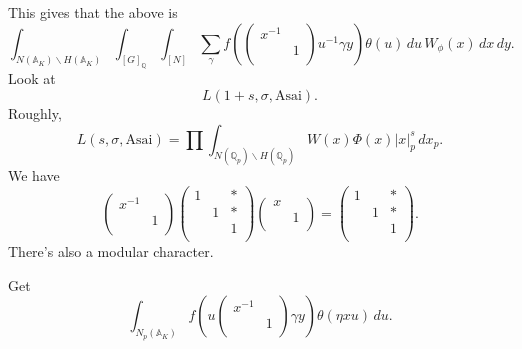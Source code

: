 \documentclass[reqno]{amsart} 
\begin{document}
This gives that the above is
\begin{equation*}
  \int_{N(\mathbb{A}_K) \backslash H(\mathbb{A}_K)}
  \int_{[G]_{\mathbb{Q}}}
  \int_{[N]}
  \sum_\gamma
  f \left(
    \begin{pmatrix}
      x^{-1}      &  \\
                  & 1 \\
    \end{pmatrix}
    u^{-1} \gamma y\right)  
  \theta(u) \,d u
  \, W_\phi(x) \,d x \,d y.
\end{equation*}
Look at
\begin{equation*}
  L(1 + s, \sigma, \mathrm{Asai}).
\end{equation*}
Roughly,
\begin{equation*}
  L(s, \sigma, \mathrm{Asai}) = \prod \int_{N(\mathbb{Q}_p) \backslash H(\mathbb{Q}_p)} W(x) \Phi(x) \lvert x \rvert^s_p \,d x_p.
\end{equation*}
We have
\begin{equation*}
  \begin{pmatrix}
    x^{-1}    &  \\
              & 1 \\
  \end{pmatrix}
  \begin{pmatrix}
    1    &  & \ast \\
         & 1 & \ast \\
         &  & 1 \\
  \end{pmatrix}
  \begin{pmatrix}
    x    &  \\
         & 1 \\
  \end{pmatrix}
  =
  \begin{pmatrix}
    1    &  & \ast \\
         & 1 & \ast \\
         &  & 1 \\
  \end{pmatrix}.
\end{equation*}
There's also a modular character.

Get
\begin{equation*}
  \int_{N_p(\mathbb{A}_K)} f \left( u
    \begin{pmatrix}
      x^{-1}      &  \\
                  & 1 \\
    \end{pmatrix} \gamma y \right)
  \theta(\eta x u) \,d u.  
\end{equation*}
\end{document}
